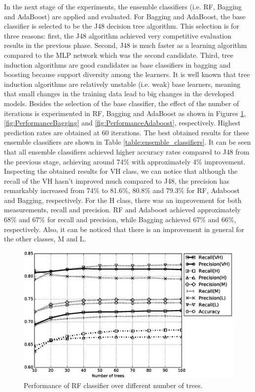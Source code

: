 \documentclass[a4paper,10pt,onecolumn,preprint,3p]{elsarticle}
\begin{document}
In the next stage of the experiments, the ensemble classifiers (i.e. RF, Bagging and AdaBoost) are applied and evaluated. For Bagging and AdaBoost, the base classifier is selected to be the J48 decision tree algorithm. This selection is for three reasons: first, the J48 algorithm achieved very competitive evaluation results in the previous phase. Second, J48 is much faster as a learning algorithm compared to the MLP network which was the second candidate. Third, tree induction algorithms are good candidates as base classifiers in bagging and boosting because support diversity among the learners. It is well known that tree induction algorithms are relatively unstable (i.e. weak) base learners, meaning that small changes in the training data lead to big changes in the developed models. Besides the selection of the base classifier, the effect of the number of iterations is experimented in RF, Bagging and AdaBoost as shown in Figures \ref{fig:PerformanceRF}, \ref{fig:PerformanceBagging} and \ref{fig:PerformanceAdaboost}, respectively. Highest prediction rates are obtained at 60 iterations. The best obtained results for these ensemble classifiers are shown in Table \ref{table:ensemble_classifiers}. It can be seen that all ensemble classifiers achieved higher accuracy rates compared to J48 from the previous stage, achieving around 74\% with approximately 4\% improvement. Inspecting the obtained results for VH class, we can notice that although the recall of the VH hasn't improved much compared to J48, the precision has remarkably increased from 74\% to 81.6\%, 80.8\% and 79.3\% for RF, Adaboost and Bagging, respectively. For the H class, there was an improvement for both measurements, recall and precision. RF and Adaboost achieved approximately 68\% and 67\% for recall and precision, while Bagging achieved 67\% and 66\%, respectively. Also, it can be noticed that there is an improvement in general for the other classes, M and L.


\begin{figure}

\centerline{\includegraphics[scale=0.46]{RF}}

\caption{Performance of RF classifier over different number of trees.}
\label{fig:PerformanceRF}
\end{figure}
\end{document}
